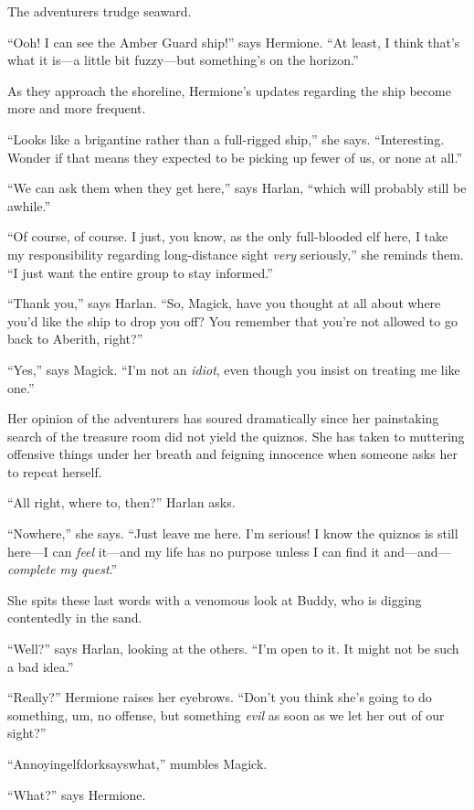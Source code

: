 \documentclass[smalldemyvopaper,11pt,twoside,onecolumn,openright,extrafontsizes]{memoir}
\newlength\drop
\begin{document}
The adventurers trudge seaward.

``Ooh! I can see the Amber Guard ship!'' says Hermione. ``At least, I
think that's what it is---a little bit fuzzy---but something's on the
horizon.''

As they approach the shoreline, Hermione's updates regarding the ship
become more and more frequent.

``Looks like a brigantine rather than a full-rigged ship,'' she says.
``Interesting. Wonder if that means they expected to be picking up fewer
of us, or none at all.''

``We can ask them when they get here,'' says Harlan, ``which will
probably still be awhile.''

``Of course, of course. I just, you know, as the only full-blooded elf
here, I take my responsibility regarding long-distance sight \emph{very}
seriously,'' she reminds them. ``I just want the entire group to stay
informed.''

``Thank you,'' says Harlan. ``So, Magick, have you thought at all about
where you'd like the ship to drop you off? You remember that you're not
allowed to go back to Aberith, right?''

``Yes,'' says Magick. ``I'm not an \emph{idiot}, even though you insist
on treating me like one.''

Her opinion of the adventurers has soured dramatically since her
painstaking search of the treasure room did not yield the quiznos. She
has taken to muttering offensive things under her breath and feigning
innocence when someone asks her to repeat herself.

``All right, where to, then?'' Harlan asks.

``Nowhere,'' she says. ``Just leave me here. I'm serious! I know the
quiznos is still here---I can \emph{feel} it---and my life has no
purpose unless I can find it and---and---\emph{complete my quest}.''

She spits these last words with a venomous look at Buddy, who is digging
contentedly in the sand.

``Well?'' says Harlan, looking at the others. ``I'm open to it. It might
not be such a bad idea.''

``Really?'' Hermione raises her eyebrows. ``Don't you think she's going
to do something, um, no offense, but something \emph{evil} as soon as we
let her out of our sight?''

``Annoyingelfdorksayswhat,'' mumbles Magick.

``What?'' says Hermione.
\end{document}
